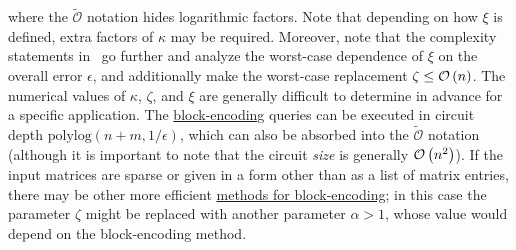 \begin{refsection}
\begin{enumerate}
\begin{equation}
\end{equation}
    where the $\tilde{\mathcal{O}}$ notation hides logarithmic factors. Note that depending on how $\xi$ is defined, extra factors of $\kappa$ may be required. Moreover, note that the complexity statements in~\cite{augustino2021quantum} go further and analyze the worst-case dependence of $\xi$ on the overall error $\epsilon$, and additionally make the worst-case replacement $\zeta \leq \mathcal{O}\left( n \right)$.
    The numerical values of $\kappa$, $\zeta$, and $\xi$ are generally difficult to determine in advance for a specific application. The \hyperref[prim:BlockEncodingsClassical]{block-encoding} queries can be executed in circuit depth $\mathrm{polylog}(n+m,1/\epsilon)$, which can also be absorbed into the $\tilde{\mathcal{O}}$ notation (although it is important to note that the circuit \emph{size} is generally $\mathcal{O}\left( n^2 \right)$). If the input matrices are sparse or given in a form other than as a list of matrix entries, there may be other more efficient \hyperref[prim:BlockEncodings]{methods for block-encoding}; in this case the parameter $\zeta$ might be replaced with another parameter $\alpha > 1$, whose value would depend on the block-encoding method.
    

\end{enumerate}
\end{refsection}
